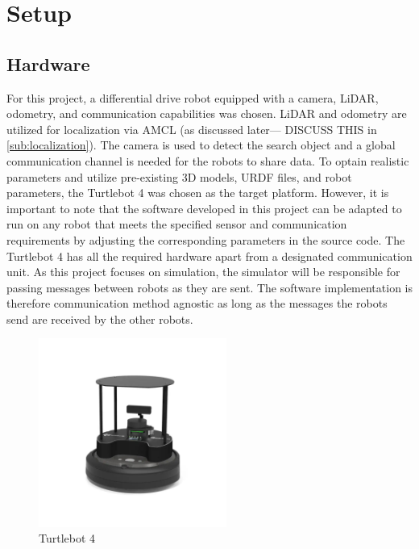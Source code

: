 \section{Setup}
\label{sec:setup}

\subsection{Hardware}

For this project, a differential drive robot equipped with a camera, LiDAR, odometry, and communication capabilities was chosen. LiDAR and odometry are utilized for localization via AMCL (as discussed later---{\color{red} DISCUSS THIS} in \cref{sub:localization}). The camera is used to detect the search object and a global communication channel is needed for the robots to share data. To optain realistic parameters and utilize pre-existing 3D models, URDF files, and robot parameters, the Turtlebot 4 \cite{tb4} was chosen as the target platform. However, it is important to note that the software developed in this project can be adapted to run on any robot that meets the specified sensor and communication requirements by adjusting the corresponding parameters in the source code.
The Turtlebot 4 has all the required hardware apart from a {\color{red} designated communication unit}. As this project focuses on simulation, the simulator will be responsible for passing messages between robots as they are sent. The software implementation is therefore {\color{red} communication method agnostic} as long as the messages the robots send are received by the other robots.

\begin{figure}[h]
    \begin{center}
        \includegraphics[width=0.55\textwidth]{figures/tb4.png}
    \end{center}
    \caption{Turtlebot 4}\label{fig:tb4}
\end{figure}



